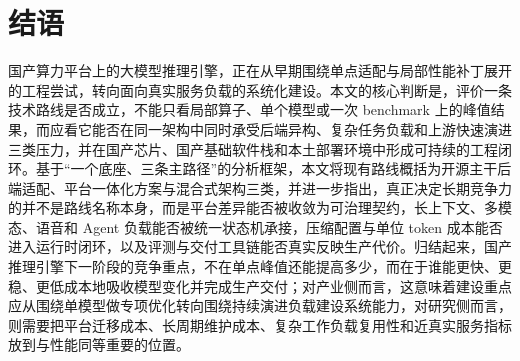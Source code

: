 \section{结语}

国产算力平台上的大模型推理引擎，正在从早期围绕单点适配与局部性能补丁展开的工程尝试，转向面向真实服务负载的系统化建设。本文的核心判断是，评价一条技术路线是否成立，不能只看局部算子、单个模型或一次 benchmark 上的峰值结果，而应看它能否在同一架构中同时承受后端异构、复杂任务负载和上游快速演进三类压力，并在国产芯片、国产基础软件栈和本土部署环境中形成可持续的工程闭环。基于“一个底座、三条主路径”的分析框架，本文将现有路线概括为开源主干后端适配、平台一体化方案与混合式架构三类，并进一步指出，真正决定长期竞争力的并不是路线名称本身，而是平台差异能否被收敛为可治理契约，长上下文、多模态、语音和 Agent 负载能否被统一状态机承接，压缩配置与单位 token 成本能否进入运行时闭环，以及评测与交付工具链能否真实反映生产代价。归结起来，国产推理引擎下一阶段的竞争重点，不在单点峰值还能提高多少，而在于谁能更快、更稳、更低成本地吸收模型变化并完成生产交付；对产业侧而言，这意味着建设重点应从围绕单模型做专项优化转向围绕持续演进负载建设系统能力，对研究侧而言，则需要把平台迁移成本、长周期维护成本、复杂工作负载复用性和近真实服务指标放到与性能同等重要的位置。
